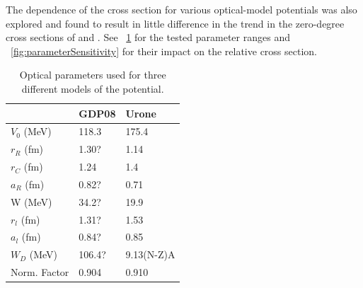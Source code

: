  The dependence of the cross section for various  optical-model potentials was also explored and found to result in little difference in the trend in the zero-degree cross sections of  and .  See {\tab}~\ref{tab:parameterSensitivity} for the tested parameter ranges and {\fig}~\ref{fig:parameterSensitivity} for their impact on the relative cross section.
\begin{table}[htp]
\centering
\begin{tabular}{lll}
 & GDP08 & Urone \\
\hline
$V_0$ (MeV) & 118.3 & 175.4 \\
$r_R$ (fm) & 1.30? & 1.14 \\
$r_C$ (fm) & 1.24 & 1.4 \\
$a_R$ (fm) & 0.82? & 0.71 \\
W (MeV) & 34.2? & 19.9 \\
$r_l$ (fm) & 1.31? & 1.53 \\
$a_l$ (fm) & 0.84? & 0.85 \\
$W_D$ (MeV) & 106.4? & 9.13(N-Z)A \\
Norm. Factor & 0.904 & 0.910 \\
\end{tabular}
\caption{Optical parameters used for three different models of the  potential.}
\label{tab:parameterSensitivity}
\end{table}

